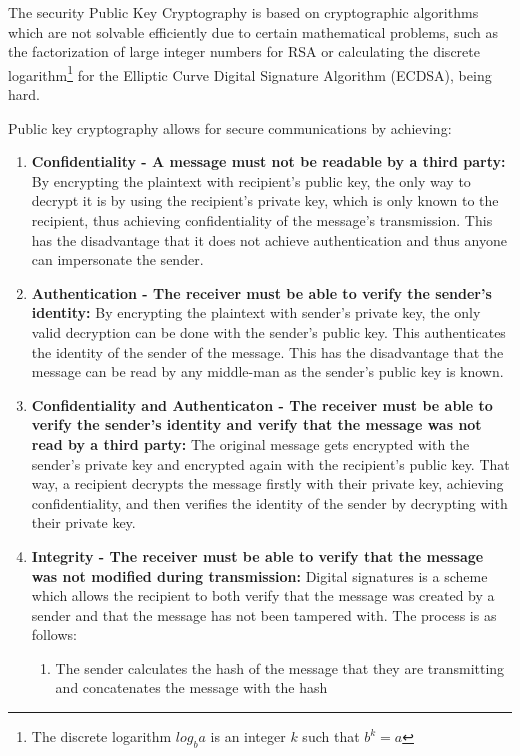 The security Public Key Cryptography is based on cryptographic algorithms which are not solvable efficiently due to certain mathematical problems, such as the factorization of large integer numbers for RSA\cite{Rivest:1978:MOD:359340.359342} or calculating the discrete logarithm\footnote{The discrete logarithm $log_{b}a$ is an integer $k$ such that $b^k = a$} for the Elliptic Curve Digital Signature Algorithm (ECDSA), being hard.

Public key cryptography allows for secure communications by achieving:

\begin{enumerate}
    \item \textbf{Confidentiality - A message must not be readable by a third party:} By encrypting the plaintext with recipient's public key, the only way to decrypt it is by using the recipient's private key, which is only known to the recipient, thus achieving confidentiality of the message's transmission. This has the disadvantage that it does not achieve authentication and thus anyone can impersonate the sender.
    \item \textbf{Authentication - The receiver must be able to verify the sender's identity:} By encrypting the plaintext with sender's private key, the only valid decryption can be done with the sender's public key. This authenticates the identity of the sender of the message. This has the disadvantage that the message can be read by any middle-man as the sender's public key is known.
    \item \textbf{Confidentiality and Authenticaton - The receiver must be able to verify the sender's identity and verify that the message was not read by a third party:} The original message gets encrypted with the sender's private key and encrypted again with the recipient's public key. That way, a recipient decrypts the message firstly with their private key, achieving confidentiality, and then verifies the identity of the sender by decrypting with their private key.
    \item \textbf{Integrity - The receiver must be able to verify that the message was not modified during transmission:} Digital signatures is a scheme which allows the recipient to both verify that the message was created by a sender and that the message has not been tampered with. 
    The process is as follows:
    \begin{enumerate}
        \item The sender calculates the hash of the message that they are transmitting and concatenates the message with the hash

\end{enumerate}
\end{enumerate}
